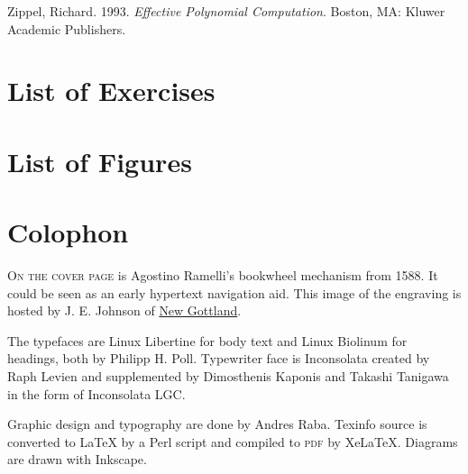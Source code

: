 \documentclass[8pt,oneside]{book}
\newcommand{\acronym}[1]{\textsc{\MakeLowercase{#1}}}
\begin{document}
 \label{Zippel 1993}
Zippel, Richard.  1993.  \textit{Effective Polynomial Computation}.  Boston, MA:
Kluwer Academic Publishers.

\label{List of Exercises}
\chapter*{List of Exercises}



\label{List of Figures}
\chapter*{List of Figures}



\printindex

\chapter*{Colophon}
\label{Colophon}

\lettrine[lraise=-0.03,loversize=0.08]{O}{n the cover page} is Agostino Ramelli's bookwheel mechanism from 1588. It could be seen as an early hypertext navigation aid. This image of the engraving is hosted by J. E. Johnson of \href{http://newgottland.com/2012/02/09/before-the-ereader-there-was-the-wheelreader/ramelli_bookwheel_1032px/}{New Gottland}. 

The typefaces are Linux Libertine for body text and Linux Biolinum for headings, both by Philipp H. Poll. Typewriter face is Inconsolata created by Raph Levien and supplemented by Dimosthenis Kaponis and Takashi Tanigawa in the form of Inconsolata LGC. 

Graphic design and typography are done by Andres Raba. Texinfo source is converted to LaTeX by a Perl script and compiled to \acronym{PDF} by XeLaTeX. Diagrams are drawn with Inkscape.
\end{document}
